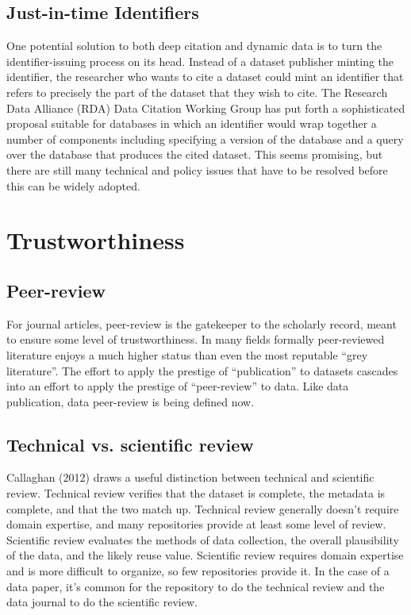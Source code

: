 \documentclass[10pt,a4paper,twocolumn]{article}
\begin{document}
\subsection*{Just-in-time Identifiers}\label{just-in-time-identifiers}

One potential solution to both deep citation and dynamic data is to turn the identifier-issuing process on its head. 
Instead of a dataset publisher minting the identifier, the researcher who wants to cite a dataset could mint an identifier that refers to precisely the part of the dataset that they wish to cite. 
The Research Data Alliance (RDA) Data Citation Working Group has put forth a sophisticated proposal suitable for databases in which an identifier would wrap together a number of components including specifying a version of the database and a query over the database that produces the cited dataset. %
This seems promising, but there are still many technical and policy issues that have to be resolved before this can be widely adopted.

\section*{Trustworthiness}\label{trustworthiness}

\subsection*{Peer-review}\label{peer-review}

For journal articles, peer-review is the gatekeeper to the scholarly record, meant to ensure some level of trustworthiness.
In many fields formally peer-reviewed literature enjoys a much higher status than even the most reputable ``grey literature''.
The effort to apply the prestige of ``publication'' to datasets cascades into an effort to apply the prestige of ``peer-review'' to data.
Like data publication, data peer-review is being defined now.

\subsection*{Technical vs. scientific review}
Callaghan (2012)\cite{callaghan_making_2012} draws a useful distinction between technical and scientific review. 
Technical review verifies that the dataset is complete, the metadata is complete, and that the two match up.  
Technical review generally doesn't require domain expertise, and many repositories provide at least some level of review. 
Scientific review evaluates the methods of data collection, the overall plausibility of the data, and the likely reuse value. 
Scientific review requires domain expertise and is more difficult to organize, so few repositories provide it.
In the case of a data paper, it's common for the repository to do the technical review and the data journal to do the scientific review.
\end{document}
